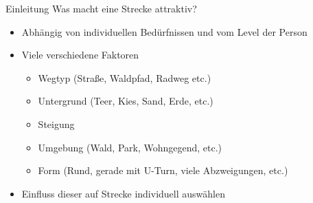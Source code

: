 \documentclass[aspectratio=169,xcolor=dvipsnames, t]{beamer}
\begin{document}
	\begin{frame}{Einleitung}
		\vspace{0.25cm}
		Was macht eine Strecke attraktiv?\\
		\pause
		\vspace{-0.2cm}
		\begin{minipage}[t]{0.48\textwidth}
			\begin{itemize}[<+->]
				\item Abhängig von individuellen Bedürfnissen und vom Level der Person
				\item Viele verschiedene Faktoren
				\begin{itemize}[<+->]
					\item Wegtyp (Straße, Waldpfad, Radweg etc.)
					\item Untergrund (Teer, Kies, Sand, Erde, etc.)
					\item Steigung
					\item Umgebung (Wald, Park, Wohngegend, etc.)
					\item Form (Rund, gerade mit U-Turn, viele Abzweigungen, etc.)
				\end{itemize}
				\item Einfluss dieser auf Strecke individuell auswählen 
		\end{itemize}
		\end{minipage}
		\begin{minipage}[t][0.7\textheight][b]{0.48\textwidth}
\end{minipage}
\end{frame}
\end{document}
